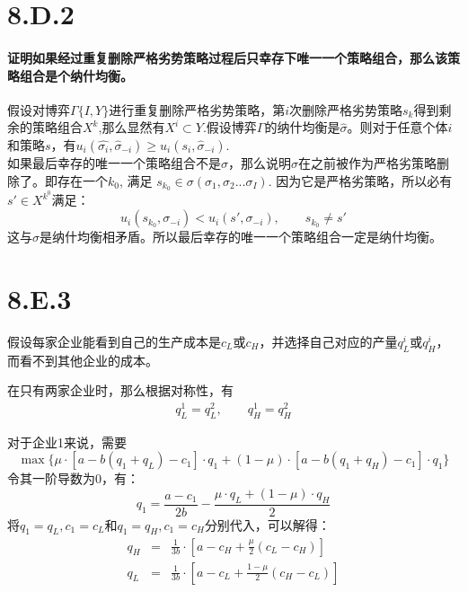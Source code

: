 \documentclass[11pt,fleqn]{article}
\begin{document}
\section*{8.D.2}
	\paragraph{证明如果经过重复删除严格劣势策略过程后只幸存下唯一一个策略组合，那么该策略组合是个纳什均衡。\\}

	假设对博弈$\Gamma\{I,Y\} $进行重复删除严格劣势策略，第$i$次删除严格劣势策略$s_k$得到剩余的策略组合$X^k$,那么显然有$X^i \subset Y $.假设博弈$\Gamma$的纳什均衡是$\hat{\sigma} $。则对于任意个体$i$和策略$s$，有$u_i(\hat{\sigma_i}, \hat{\sigma}_{-i}) \ge u_i(s_i, \hat{\sigma}_{-i} ) $. \\
	如果最后幸存的唯一一个策略组合不是$\sigma $，那么说明$\sigma$在之前被作为严格劣策略删除了。即存在一个$k_0$,
	满足
	$ s_{k_0} \in \sigma (\sigma_1, \sigma_2 ... \sigma_{I}) $. 因为它是严格劣策略，所以必有$s' \in X^{k^0} $满足：
	\begin{displaymath}
		u_i( s_{k_0},\sigma_{-i} ) < u_i(s', \sigma_{-i} ), \qquad s_{k_0} \neq s'
	\end{displaymath}
	这与$\sigma$是纳什均衡相矛盾。所以最后幸存的唯一一个策略组合一定是纳什均衡。


\section*{8.E.3}
	假设每家企业能看到自己的生产成本是$c_L$或$c_H$，并选择自己对应的产量$q_L^i$或$q_H^i$，而看不到其他企业的成本。

	在只有两家企业时，那么根据对称性，有
	\begin{eqnarray*}
		q_L^1 =q_L^2 , \qquad
		q_H^1 =q_H^2  
	\end{eqnarray*}

	对于企业1来说，需要
	\begin{displaymath}
		\max \{\mu \cdot[a-b(q_1+q_L)-c_1] \cdot q_1 + (1-\mu)\cdot [a-b(q_1+q_H)-c_1] \cdot q_1 \}
	\end{displaymath}
	令其一阶导数为0，有：
	\begin{displaymath}
		q_1 = \frac{a-c_1}{2b}-\frac{\mu \cdot q_L + (1-\mu)\cdot  q_H}{2}
	\end{displaymath}
	将$q_1=q_L, c_1=c_L $和$q_1=q_H, c_1=c_H $分别代入，可以解得：
	\begin{eqnarray*}
	q_H &=& \frac{1}{3b}\cdot [a-c_H +\frac{\mu}{2}(c_L-c_H) ] \\
	q_L &=& \frac{1}{3b} \cdot [a-c_L + \frac{1-\mu}{2}(c_H-c_L) ]
	\end{eqnarray*}
\end{document}
